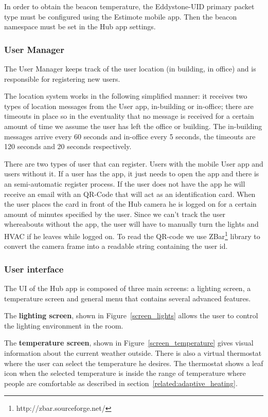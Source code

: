 In order to obtain the beacon temperature, the Eddystone-UID primary packet type must be configured using the Estimote mobile app. Then the beacon namespace must be set in the Hub app settings.


\subsubsection{User Manager}


The User Manager keeps track of the user location (in building, in office) and is responsible for registering new users.

The location system works in the following simplified manner: it receives two types of location messages from the User app, in-building or in-office; there are timeouts in place so in the eventuality that no message is received for a certain amount of time we assume the user has left the office or building. The in-building messages arrive every 60 seconds and in-office every 5 seconds, the timeouts are 120 seconds and 20 seconds respectively.


There are two types of user that can register. Users with the mobile User app and users without it. If a user has the app, it just needs to open the app and there is an semi-automatic register process. If the user does not have the app he will receive an email with an QR-Code that will act as an identification card. When the user places the card in front of the Hub camera he is logged on for a certain amount of minutes specified by the user. Since we can't track the user whereabouts without the app, the user will have to manually turn the lights and \ac{HVAC} if he leaves while logged on.
To read the QR-code we use ZBar\footnote{http://zbar.sourceforge.net/} library to convert the camera frame into a readable string containing the user id.



\subsubsection{User interface}


The \ac{UI} of the Hub app is composed of three main screens: a lighting screen, a temperature screen and general menu that contains several advanced features.

The \textbf{lighting screen}, shown in Figure~\ref{screen_lights} allows the user to control the lighting environment in the room.

The \textbf{temperature screen}, shown in Figure~\ref{screen_temperature} gives visual information about the current weather outside. There is also a virtual thermostat where the user can select the temperature he desires. The thermostat shows a leaf icon when the selected temperature is inside the range of temperature where people are comfortable as described in section~\ref{related:adaptive_heating}. 

